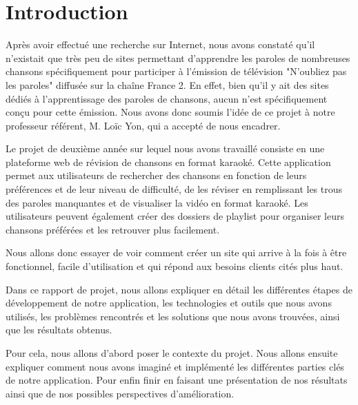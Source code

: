 \documentclass[12pt,french]{article}
\begin{document}
\newpage


\renewcommand{\contentsname}{Table des matières}
\normalsize\tableofcontents %

\newpage

\vspace*{0.01cm}

\section*{Introduction}

Après avoir effectué une recherche sur Internet, nous avons constaté qu'il n'existait que très peu de sites permettant d'apprendre les paroles de nombreuses chansons spécifiquement pour participer à l'émission de télévision "N'oubliez pas les paroles" diffusée sur la chaîne France 2. En effet, bien qu'il y ait des sites dédiés à l'apprentissage des paroles de chansons, aucun n'est spécifiquement conçu pour cette émission. Nous avons donc soumis l'idée de ce projet à notre professeur référent, M. Loïc Yon, qui a accepté de nous encadrer.

\bigskip

Le projet de deuxième année sur lequel nous avons travaillé consiste en une plateforme web de révision de chansons en format karaoké. Cette application permet aux utilisateurs de rechercher des chansons en fonction de leurs préférences et de leur niveau de difficulté, de les réviser en remplissant les trous des paroles manquantes et de visualiser la vidéo en format karaoké. Les utilisateurs peuvent également créer des dossiers de playlist pour organiser leurs chansons préférées et les retrouver plus facilement.

Nous allons donc essayer de voir comment créer un site qui arrive à la fois à être fonctionnel, facile d'utilisation et qui répond aux besoins clients cités plus haut.

\bigskip

Dans ce rapport de projet, nous allons expliquer en détail les différentes étapes de développement de notre application, les technologies et outils que nous avons utilisés, les problèmes rencontrés et les solutions que nous avons trouvées, ainsi que les résultats obtenus.

\medskip

Pour cela, nous allons d'abord poser le contexte du projet. Nous allons ensuite expliquer comment nous avons imaginé et implémenté les différentes parties clés de notre application. Pour enfin finir en faisant une présentation de nos résultats ainsi que de nos possibles perspectives d'amélioration.
\end{document}
